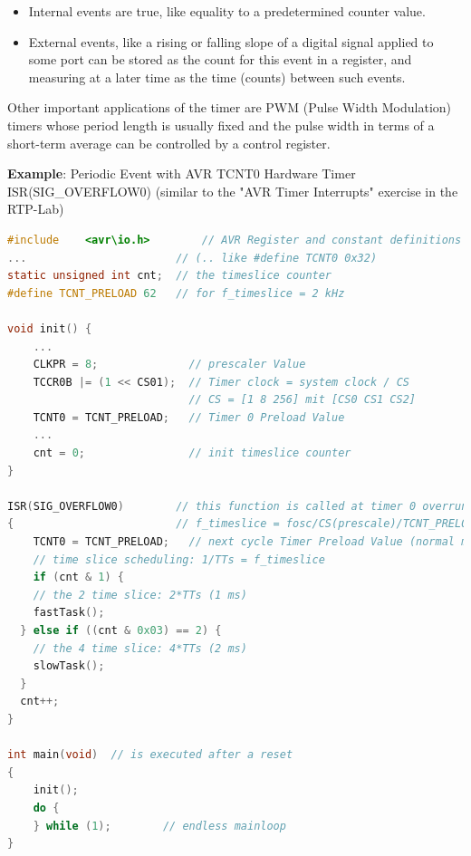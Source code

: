 \begin{itemize}
\item  Internal events are true, like equality to a predetermined counter value.
\item  External events, like a rising or falling slope of a digital signal applied to some port can be stored as the count for this event in a register, and measuring at a later time as the time (counts) between such events.
\end{itemize}

Other important applications of the timer are PWM (Pulse Width Modulation) timers whose period length is usually fixed and the pulse width in terms of a short-term average can be controlled by a control register.\\

\newpage

\textbf{Example}: Periodic Event with AVR TCNT0 Hardware Timer  ISR(SIG\_OVERFLOW0) (similar to the "AVR Timer Interrupts" exercise in the RTP-Lab)\\

\begin{lstlisting}[style=mystyle, language=c]
#include	<avr\io.h>		  // AVR Register and constant definitions
...                       // (.. like #define TCNT0 0x32)
static unsigned int cnt;  // the timeslice counter
#define TCNT_PRELOAD 62   // for f_timeslice = 2 kHz 

void init() {
	...
	CLKPR = 8;              // prescaler Value
	TCCR0B |= (1 << CS01);  // Timer clock = system clock / CS
	                     	// CS = [1 8 256] mit [CS0 CS1 CS2]
	TCNT0 = TCNT_PRELOAD;   // Timer 0 Preload Value
	...
	cnt = 0;                // init timeslice counter
}

ISR(SIG_OVERFLOW0)        // this function is called at timer 0 overrun
{                         // f_timeslice = fosc/CS(prescale)/TCNT_PRELOAD
	TCNT0 = TCNT_PRELOAD;   // next cycle Timer Preload Value (normal mode)
	// time slice scheduling: 1/TTs = f_timeslice
	if (cnt & 1) {
	// the 2 time slice: 2*TTs (1 ms)
	fastTask();                   
  } else if ((cnt & 0x03) == 2) {
	// the 4 time slice: 4*TTs (2 ms)
	slowTask();          
  }
  cnt++;
}

int main(void)  // is executed after a reset
{
	init();        
	do {
	} while (1);		// endless mainloop
}

\end{lstlisting}

